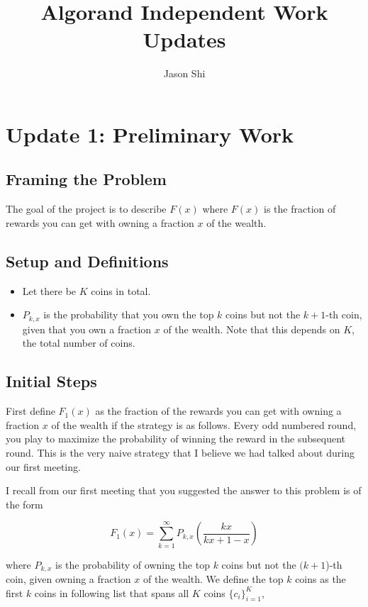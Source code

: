 \documentclass[11pt, oneside]{article}   	%
\title{Algorand Independent Work Updates}
\author{Jason Shi}
\begin{document}
\maketitle
\section{Update 1: Preliminary Work}
\subsection{Framing the Problem}

The goal of the project is to describe $F(x)$ where $F(x)$ is the fraction of rewards you can get with owning a fraction $x$ of the wealth.

\subsection{Setup and Definitions}
\begin{itemize}
  \item Let there be $K$ coins in total.
  \item $P_{k, x}$ is the probability that you own the top $k$ coins but not the $k+1$-th coin, given that you own a fraction $x$ of the wealth. Note that this depends on $K$, the total number of coins.
\end{itemize}

\subsection{Initial Steps}

First define $F_1(x)$ as the fraction of the rewards you can get with owning a fraction $x$ of the wealth if the strategy is as follows. Every odd numbered round, you play to maximize the probability of winning the reward in the subsequent round. This is the very naive strategy that I believe we had talked about during our first meeting.

I recall from our first meeting that you suggested the answer to this problem is of the form

$$
F_1(x) = \sum_{k=1}^{\infty} P_{k, x} \left(\frac{kx}{kx+1-x}\right)
$$

where $P_{k, x}$ is the probability of owning the top $k$ coins but not the $(k+1$)-th coin, given owning a fraction $x$ of the wealth. We define the top $k$ coins as the first $k$ coins in following list that spans all $K$ coins $\{c_i\}_{i=1}^K$,
\end{document}
